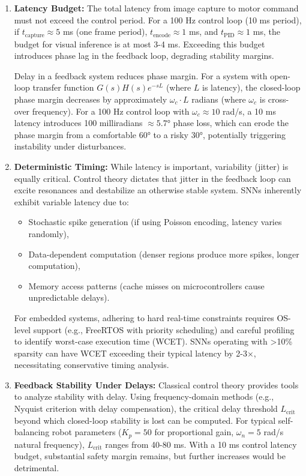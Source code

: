 \begin{enumerate}
    
\item \textbf{Latency Budget:} The total latency from image capture to motor command must not exceed the control 
period. For a 100 Hz control loop (10 ms period), if $t_{\text{capture}} \approx 5$ ms (one frame period), 
$t_{\text{encode}} \approx 1$ ms, and $t_{\text{PID}} \approx 1$ ms, the budget for visual inference is at most 
3-4 ms. Exceeding this budget introduces phase lag in the feedback loop, degrading stability margins.

Delay in a feedback system reduces phase margin. For a system with open-loop transfer function $G(s)H(s)e^{-sL}$ 
(where $L$ is latency), the closed-loop phase margin decreases by approximately $\omega_c \cdot L$ radians (where 
$\omega_c$ is cross-over frequency). For a 100 Hz control loop with $\omega_c \approx 10$ rad/s, a 10 ms latency 
introduces 100 milliradians $\approx 5.7°$ phase loss, which can erode the phase margin from a comfortable 60° to 
a risky 30°, potentially triggering instability under disturbances.

    
\item \textbf{Deterministic Timing:} While latency is important, variability (jitter) is equally critical. Control 
theory dictates that jitter in the feedback loop can excite resonances and destabilize an otherwise stable system. 
SNNs inherently exhibit variable latency due to:
    \begin{itemize}
        \item Stochastic spike generation (if using Poisson encoding, latency varies randomly),
        \item Data-dependent computation (denser regions produce more spikes, longer computation),
        \item Memory access patterns (cache misses on microcontrollers cause unpredictable delays).
    \end{itemize}
    
For embedded systems, adhering to hard real-time constraints requires OS-level support (e.g., FreeRTOS with 
priority scheduling) and careful profiling to identify worst-case execution time (WCET). SNNs operating with 
>10\% sparsity can have WCET exceeding their typical latency by 2-3×, necessitating conservative timing analysis.

    
\item \textbf{Feedback Stability Under Delays:} Classical control theory provides tools to analyze stability 
with delay. Using frequency-domain methods (e.g., Nyquist criterion with delay compensation), the critical delay 
threshold $L_{\text{crit}}$ beyond which closed-loop stability is lost can be computed. For typical self-balancing 
robot parameters ($K_p = 50$ for proportional gain, $\omega_n = 5$ rad/s natural frequency), $L_{\text{crit}}$ 
ranges from 40-80 ms. With a 10 ms control latency budget, substantial safety margin remains, but further increases 
would be detrimental.

\end{enumerate}

